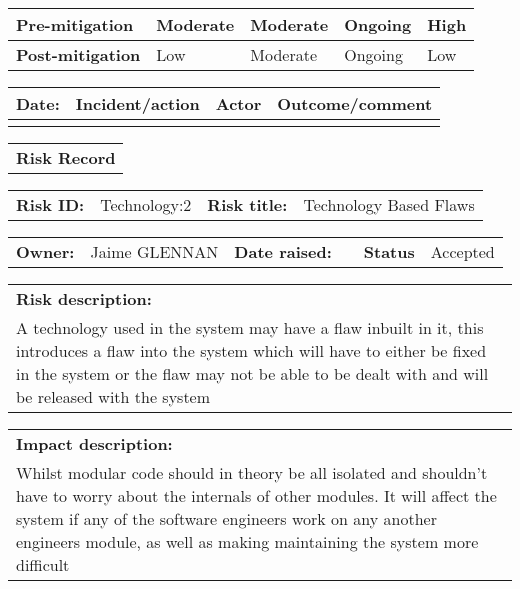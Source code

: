 \begin{table}
\begin{tabularx}{\textwidth}{| l | l | X | X | X |}
		\textbf{Pre-mitigation} & Moderate & Moderate & Ongoing & High \\ \hline
		\textbf{Post-mitigation} & Low & Moderate & Ongoing & Low \\ \hline \hline
	\end{tabularx}
	\begin{tabularx}{\textwidth}{| l | X | l | X |}
		\hline
		\textbf{Date:} & \textbf{Incident/action} & \textbf{Actor} & \textbf{Outcome/comment} \\ \hline
		 &  &  &  \\ \hline
	\end{tabularx}
\end{table}

\begin{table}
	\begin{tabularx}{\textwidth}{| X |}
		\hline
		\textbf{Risk Record}
	\end{tabularx}
	\begin{tabularx}{\textwidth}{| l | X | l | X |}
		\hline
		\textbf{Risk ID:} & Technology:2 & \textbf{Risk title:} & Technology Based Flaws \\
	\end{tabularx}
	\begin{tabularx}{\textwidth}{| l | X | l | X | l | X |}
		\hline
		\textbf{Owner:} & Jaime GLENNAN & \textbf{Date raised:} &  & \textbf{Status} & Accepted \\
	\end{tabularx}
	\begin{tabularx}{\textwidth}{| X |}
		\hline
		\textbf{Risk description:} \\ A technology used in the system may have a flaw inbuilt in it, this introduces a flaw into the system which will have to either be fixed in the system or the flaw may not be able to be dealt with and will be released with the system \\
	\end{tabularx}
	\begin{tabularx}{\textwidth}{| X |}
		\hline
		\textbf{Impact description:} \\ Whilst modular code should in theory be all isolated and shouldn't have to worry about the internals of other modules. It will affect the system if any of the software engineers work on any another engineers module, as well as making maintaining the system more difficult \\
	\end{tabularx}
	\begin{tabularx}{\textwidth}{| X |}

\end{tabularx}
\end{table}

